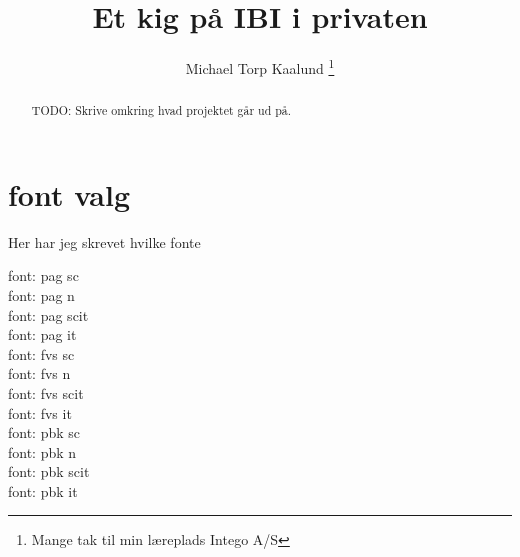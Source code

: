 \documentclass[12pt,a4paper]{report}
\title{Et kig på IBI i privaten}
\author{Michael Torp Kaalund \thanks{Mange tak til min læreplads Intego A/S}}
\begin{document}
    
    

    \begin{abstract}
        TODO: Skrive omkring hvad projektet går ud på.
    \end{abstract}

    \tableofcontents

    \part{font valg}

    Her har jeg skrevet hvilke fonte

     font: pag sc \\
     font: pag n \\
     font: pag scit \\
     font: pag it \\

     font: fvs sc \\
     font: fvs n \\
     font: fvs scit \\
     font: fvs it \\

     font: pbk sc \\
     font: pbk n \\
     font: pbk scit \\
     font: pbk it \\   
\end{document}
